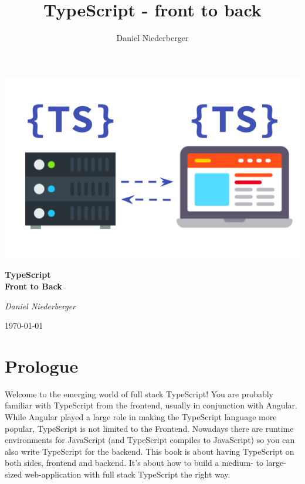 \documentclass[12pt,a4paper]{report}
\title{TypeScript - front to back}
\author{Daniel Niederberger}
\begin{document}
\begin{titlepage}
	\centering
	\includegraphics[width=1\textwidth]{figures/cover-image.png}\par
	\vspace{1.5cm}
	{\huge\bfseries TypeScript \\ \Huge{Front to Back}\par}
	\vspace{2cm}
	{\Large\itshape Daniel Niederberger\par}

	\vfill

	{\large \today\par}
\end{titlepage}

\tableofcontents
\newpage

\chapter*{Prologue}
Welcome to the emerging world of full stack TypeScript! You are probably familiar with TypeScript from the frontend, usually in conjunction with Angular. While Angular played a large role in making the TypeScript language more popular, TypeScript is not limited to the Frontend. Nowadays there are runtime environments for JavaScript (and TypeScript compiles to JavaScript) so you can also write TypeScript for the backend. This book is about having TypeScript on both sides, frontend and backend. It's about how to build a medium- to large-sized web-application with full stack TypeScript the right way.
\end{document}
